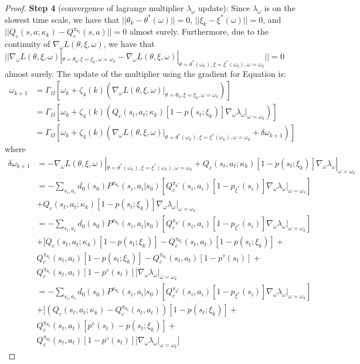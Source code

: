 \documentclass{article}
\theoremstyle{definition}
\begin{document}
\begin{proof}
\textbf{Step 4} (convergence of lagrange multiplier $\lambda_\omega$ update): Since $\lambda_\omega$ is on the slowest time scale, we have that $||\theta_k - \theta^*(\omega)||=0$, $||\xi_k - \xi^*(\omega)||=0$, and $||Q_c(s,a;\kappa_k) - Q^{\pi_{\theta_k}}_c(s,a)||=0$ almost surely. Furthermore, due to the continuity of $\nabla_\omega L(\theta, \xi, \omega)$, we have that $||\nabla_\omega L(\theta, \xi, \omega)|_{\theta=\theta_k, \xi=\xi_k, \omega=\omega_k} - \nabla_\omega L(\theta, \xi, \omega)|_{\theta=\theta^*(\omega_k), \xi=\xi^*(\omega_k), \omega=\omega_k}||=0$ almost surely. The update of the multiplier using the gradient for Equation is:
\begin{align*}
    \omega_{k+1} &=\Gamma_\Omega [ \omega_k + \zeta_4(k)( \nabla_\omega L(\theta, \xi, \omega)|_{\theta=\theta_k, \xi=\xi_k, \omega=\omega_k})] \\
    &=\Gamma_\Omega [ \omega_k + \zeta_4(k)( Q_c(s_t, a_t; \kappa_k)[1-p(s_t; \xi_k)]\nabla_\omega \lambda_\omega |_{\omega=\omega_k})] \\
    &=\Gamma_\Omega [ \omega_k + \zeta_4(k)( \nabla_\omega L(\theta, \xi, \omega)|_{\theta=\theta^*(\omega_k), \xi=\xi^*(\omega_k), \omega=\omega_k} + \delta \omega_{k+1})]
\end{align*}
where 
\begin{align*}
    \delta \omega_{k+1} &= -\nabla_\omega L(\theta, \xi, \omega)|_{\theta=\theta^*(\omega_k), \xi=\xi^*(\omega_k), \omega=\omega_k} + Q_c(s_t, a_t; \kappa_k)[1-p(s_t; \xi_k)]\nabla_\omega \lambda_\omega |_{\omega=\omega_k} \\
    &= -\sum_{s_i,a_i} d_0(s_0)P^{\pi_{\theta_k}}(s_i,a_i|s_0)[Q^{\pi_{\theta^*}}_c(s_i,a_i)[1-p_{\xi^*}(s_i)]\nabla_\omega \lambda_\omega |_{\omega=\omega_k} ] \\
    &+ Q_c(s_t, a_t; \kappa_k)[1-p(s_t; \xi_k)]\nabla_\omega \lambda_\omega |_{\omega=\omega_k} \\ 
    &=-\sum_{s_i,a_i} d_0(s_0)P^{\pi_{\theta_k}}(s_i,a_i|s_0)[Q^{\pi_{\theta^*}}_c(s_i,a_i)[1-p_{\xi^*}(s_i)]\nabla_\omega \lambda_\omega |_{\omega=\omega_k} ] \\
    &+ [Q_c(s_t, a_t; \kappa_k)[1-p(s_t; \xi_k)] -  Q^{\pi_{\theta_k}}_c(s_t, a_t)[1-p(s_t; \xi_k)] +\\
    &Q^{\pi_{\theta_k}}_c(s_t, a_t)[1-p(s_t; \xi_k)] - Q^{\pi_{\theta_k}}_c(s_t, a_t)[1-p^\diamond(s_t)] + \\
    &Q^{\pi_{\theta_k}}_c(s_t, a_t)[1-p^\diamond(s_t)] ]\nabla_\omega \lambda_\omega |_{\omega=\omega_k} \\
    &=-\sum_{s_i,a_i} d_0(s_0)P^{\pi_{\theta_k}}(s_i,a_i|s_0)[Q^{\pi_{\theta^*}}_c(s_i,a_i)[1-p_{\xi^*}(s_i)]\nabla_\omega \lambda_\omega |_{\omega=\omega_k} ] \\
    &+ [(Q_c(s_t, a_t; \kappa_k)-Q^{\pi_{\theta_k}}_c(s_t, a_t))[1-p(s_t; \xi_k)]  +\\
    &Q^{\pi_{\theta_k}}_c(s_t, a_t)[p^\diamond(s_t)-p(s_t; \xi_k)] + \\
    &Q^{\pi_{\theta_k}}_c(s_t, a_t)[1-p^\diamond(s_t)]] \nabla_\omega \lambda_\omega |_{\omega=\omega_k}]
\end{align*}


\end{proof}
\end{document}
